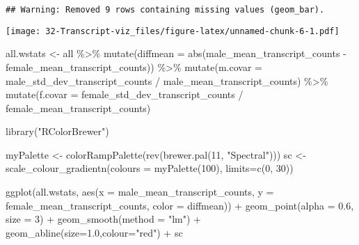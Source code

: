 \documentclass[
]{article}
\newenvironment{Shaded}{\begin{snugshade}}{\end{snugshade}}
\newcommand{\AttributeTok}[1]{\textcolor[rgb]{0.77,0.63,0.00}{#1}}
\newcommand{\DecValTok}[1]{\textcolor[rgb]{0.00,0.00,0.81}{#1}}
\newcommand{\FloatTok}[1]{\textcolor[rgb]{0.00,0.00,0.81}{#1}}
\newcommand{\FunctionTok}[1]{\textcolor[rgb]{0.00,0.00,0.00}{#1}}
\newcommand{\NormalTok}[1]{#1}
\newcommand{\OtherTok}[1]{\textcolor[rgb]{0.56,0.35,0.01}{#1}}
\newcommand{\SpecialCharTok}[1]{\textcolor[rgb]{0.00,0.00,0.00}{#1}}
\newcommand{\StringTok}[1]{\textcolor[rgb]{0.31,0.60,0.02}{#1}}
\begin{document}
\begin{verbatim}
## Warning: Removed 9 rows containing missing values (geom_bar).
\end{verbatim}

\texttt{[image: 32-Transcript-viz\_files/figure-latex/unnamed-chunk-6-1.pdf]}

\begin{Shaded}
\begin{Highlighting}[]
\NormalTok{all.wstats }\OtherTok{\textless{}{-}}\NormalTok{ all }\SpecialCharTok{\%\textgreater{}\%} \FunctionTok{mutate}\NormalTok{(}\AttributeTok{diffmean =} \FunctionTok{abs}\NormalTok{(male\_mean\_transcript\_counts }\SpecialCharTok{{-}}\NormalTok{ female\_mean\_transcript\_counts)) }\SpecialCharTok{\%\textgreater{}\%} 
  \FunctionTok{mutate}\NormalTok{(}\AttributeTok{m.covar =}\NormalTok{ male\_std\_dev\_transcript\_counts }\SpecialCharTok{/}\NormalTok{ male\_mean\_transcript\_counts) }\SpecialCharTok{\%\textgreater{}\%}
  \FunctionTok{mutate}\NormalTok{(}\AttributeTok{f.covar =}\NormalTok{ female\_std\_dev\_transcript\_counts }\SpecialCharTok{/}\NormalTok{ female\_mean\_transcript\_counts)}
\end{Highlighting}
\end{Shaded}

\begin{Shaded}
\begin{Highlighting}[]
\FunctionTok{library}\NormalTok{(}\StringTok{"RColorBrewer"}\NormalTok{)}
\end{Highlighting}
\end{Shaded}

\begin{Shaded}
\begin{Highlighting}[]
\NormalTok{myPalette }\OtherTok{\textless{}{-}} \FunctionTok{colorRampPalette}\NormalTok{(}\FunctionTok{rev}\NormalTok{(}\FunctionTok{brewer.pal}\NormalTok{(}\DecValTok{11}\NormalTok{, }\StringTok{"Spectral"}\NormalTok{)))}
\NormalTok{sc }\OtherTok{\textless{}{-}} \FunctionTok{scale\_colour\_gradientn}\NormalTok{(}\AttributeTok{colours =} \FunctionTok{myPalette}\NormalTok{(}\DecValTok{100}\NormalTok{), }\AttributeTok{limits=}\FunctionTok{c}\NormalTok{(}\DecValTok{0}\NormalTok{, }\DecValTok{30}\NormalTok{))}

\FunctionTok{ggplot}\NormalTok{(all.wstats, }\FunctionTok{aes}\NormalTok{(}\AttributeTok{x =}\NormalTok{ male\_mean\_transcript\_counts, }\AttributeTok{y =}\NormalTok{ female\_mean\_transcript\_counts, }\AttributeTok{color =}\NormalTok{ diffmean)) }\SpecialCharTok{+}
  \FunctionTok{geom\_point}\NormalTok{(}\AttributeTok{alpha =} \FloatTok{0.6}\NormalTok{, }\AttributeTok{size =} \DecValTok{3}\NormalTok{) }\SpecialCharTok{+}
  \FunctionTok{geom\_smooth}\NormalTok{(}\AttributeTok{method =} \StringTok{"lm"}\NormalTok{) }\SpecialCharTok{+}
  \FunctionTok{geom\_abline}\NormalTok{(}\AttributeTok{size=}\FloatTok{1.0}\NormalTok{,}\AttributeTok{colour=}\StringTok{"red"}\NormalTok{) }\SpecialCharTok{+}
\NormalTok{  sc }
\end{Highlighting}
\end{Shaded}
\end{document}
